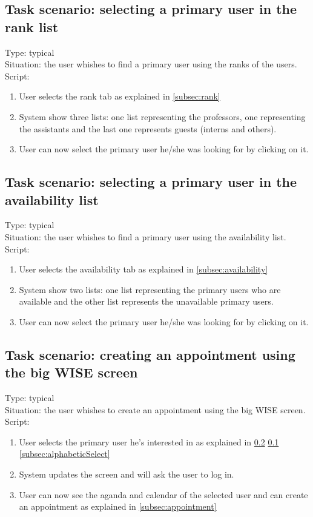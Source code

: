 \documentclass[11pt, a4paper,svglistings]{report}
\begin{document}
\subsection{Task scenario: selecting a primary user in the rank list}


\label{subsec:rankSelect}Type: typical \\
Situation: the user whishes to find a primary user using the ranks of the users. \\
Script:
\begin{enumerate}
\item User selects the rank tab as explained in \ref{subsec:rank}
\item System show three lists: one list representing the professors, one representing the assistants and the last one represents guests (interns and others).
\item User can now select the primary user he/she was looking for by clicking on it.
\end{enumerate}


\subsection{Task scenario: selecting a primary user in the availability list}


\label{subsec:availabilitySelect}Type: typical \\
Situation: the user whishes to find a primary user using the availability list. \\
Script:
\begin{enumerate}
\item User selects the availability tab as explained in \ref{subsec:availability}
\item System show two lists: one list representing the primary users who are available and the other list represents the unavailable primary users.
\item User can now select the primary user he/she was looking for by clicking on it.
\end{enumerate}


\subsection{Task scenario: creating an appointment using the big WISE screen}


Type: typical \\
Situation: the user whishes to create an appointment using the big WISE screen. \\
Script:
\begin{enumerate}
\item User selects the primary user he's interested in as explained in \ref{subsec:availabilitySelect} \ref{subsec:rankSelect} \ref{subsec:alphabeticSelect}
\item System updates the screen and will ask the user to log in.
\item User can now see the aganda and calendar of the selected user and can create an appointment as explained in \ref{subsec:appointment}
\end{enumerate}

\end{document}
